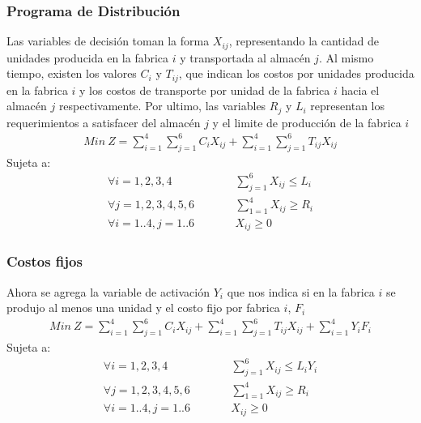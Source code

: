
\pagebreak
\begin{homeworkProblem}
\subsubsection{Programa de Distribución}
Las variables de decisión toman la forma $X_{ij}$, representando la cantidad de unidades producida en la fabrica $i$ y transportada al almacén $j$.
Al mismo tiempo, existen los valores $C_i$ y $T_{ij}$, que indican los costos por unidades producida en la fabrica $i$ y los costos de transporte por unidad de la fabrica $i$ hacia el almacén $j$ respectivamente. Por ultimo, las variables $R_j$ y $L_i$  representan los requerimientos a satisfacer del almacén $j$ y el limite de producción de la fabrica $i$
\begin{align*}
    Min\ Z = \sum_{i=1}^{4}{\sum_{j=1}^{6}{C_iX_{ij}}}   +
     \sum_{i=1}^{4}{\sum_{j=1}^{6}{T_{ij}X_{ij}}}
\end{align*}
Sujeta a:
\begin{align*}
    &\forall i=1,2,3,4&\quad\quad &\sum_{j=1}^{6}{X_{ij}}\leq L_i& \\
    &\forall j=1,2,3,4,5,6&\quad\quad &\sum_{1=1}^{4}{X_{ij}}\geq R_i& \\
    &\forall i=1..4,j=1..6&\quad\quad &X_{ij}\geq 0&
\end{align*}


\subsubsection{Costos fijos}
Ahora se agrega la variable de activación $Y_{i}$  que nos indica si en la fabrica $i$ se produjo al menos una unidad y el costo fijo por fabrica $i$, $F_i$
\begin{align*}
    Min\ Z = \sum_{i=1}^{4}{\sum_{j=1}^{6}{C_iX_{ij}}}   +
     \sum_{i=1}^{4}{\sum_{j=1}^{6}{T_{ij}X_{ij}}} + \sum_{i=1}^{4}{Y_iF_i}
\end{align*}
Sujeta a:
\begin{align*}
    &\forall i=1,2,3,4&\quad\quad &\sum_{j=1}^{6}{X_{ij}}\leq L_iY_i& \\
    &\forall j=1,2,3,4,5,6&\quad\quad &\sum_{1=1}^{4}{X_{ij}}\geq R_i& \\
    &\forall i=1..4,j=1..6&\quad\quad &X_{ij}\geq 0&
\end{align*}



\end{homeworkProblem}
